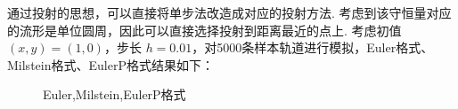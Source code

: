 通过投射的思想，可以直接将单步法改造成对应的投射方法. 考虑到该守恒量对应的流形是单位圆周，因此可以直接选择投射到距离最近的点上. 考虑初值 $(x,y) = (1,0)$，步长 $h= 0.01$，对5000条样本轨道进行模拟，Euler格式、Milstein格式、EulerP格式结果如下：
\begin{figure}[!htbp]
	\centering 
	\vspace{.2cm}
	\caption{Euler,Milstein,EulerP格式}
	\label{fig.6.7}
\end{figure}

